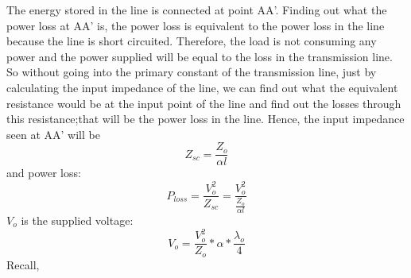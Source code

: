 The energy stored in the line is connected at point AA'. Finding out what the power loss at AA' is, the power loss is equivalent to the power loss in the line because the line is short circuited. Therefore, the load is not consuming any power and the power supplied will be equal to the loss in the transmission line. So without going into the primary constant of the transmission  line, just by calculating the input impedance of the line, we can find out what the equivalent resistance would be at the input point of the line and find out the losses through this resistance;that will be the power loss in the line. Hence, the input impedance seen at AA' will be
\begin{equation}
Z_{sc} = \frac{Z_{o}}{\alpha l}
\end{equation}
and power loss:
\begin{equation}
P_{loss} = \frac{V_{o}^{2}}{Z_{sc}} = \frac{V_{o}^{2}}{\frac{Z_{o}}{\alpha l}}
\end{equation}
$ V_{o} $ is the supplied voltage:
\begin{equation}
V_{o} = \frac{V_{o}^{2}}{Z_{o}}*\alpha *\frac{\lambda_{o}}{4}
\end{equation}
Recall,
  
